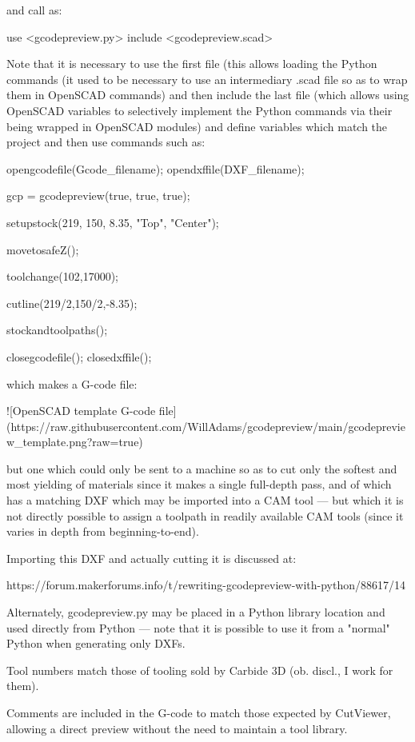 \documentclass{ltxdoc}
\begin{document}
\begin{readme}
and call as:

    use <gcodepreview.py>
    include <gcodepreview.scad>

Note that it is necessary to use the first file (this allows loading the Python commands (it used to be necessary to use an intermediary .scad file so as to wrap them in OpenSCAD commands) and then include the last file (which allows using OpenSCAD variables to selectively implement the Python commands via their being wrapped in OpenSCAD modules) and define variables which match the project and then use commands such as:

    opengcodefile(Gcode_filename);
    opendxffile(DXF_filename);
    
    gcp = gcodepreview(true, true, true);

    setupstock(219, 150, 8.35, "Top", "Center");
    
    movetosafeZ();
    
    toolchange(102,17000);
    
    cutline(219/2,150/2,-8.35);

    stockandtoolpaths();
    
    closegcodefile();
    closedxffile();

which makes a G-code file:

![OpenSCAD template G-code file](https://raw.githubusercontent.com/WillAdams/gcodepreview/main/gcodepreview_template.png?raw=true)

but one which could only be sent to a machine so as to cut only the softest and most yielding of materials since it makes a single full-depth pass, and of which has a matching DXF which may be imported into a CAM tool --- but which it is not directly possible to assign a toolpath in readily available CAM tools (since it varies in depth from beginning-to-end). 

Importing this DXF and actually cutting it is discussed at:

https://forum.makerforums.info/t/rewriting-gcodepreview-with-python/88617/14

Alternately, gcodepreview.py may be placed in a Python library location and used directly from Python --- note that it is possible to use it from a "normal" Python when generating only DXFs.

Tool numbers match those of tooling sold by Carbide 3D (ob. discl., I work for them). 

Comments are included in the G-code to match those expected by CutViewer, allowing a direct preview without the need to maintain a tool library.


\end{readme}
\end{document}

